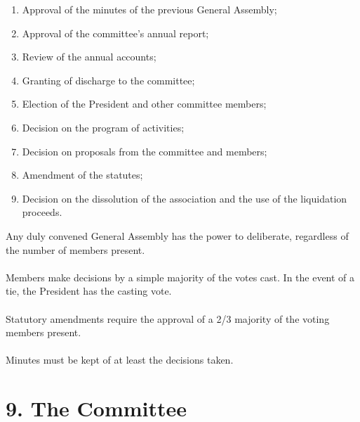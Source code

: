 \documentclass[11pt,a4paper]{article}
\begin{document}
\begin{enumerate}
    \item Approval of the minutes of the previous General Assembly;
    \item Approval of the committee's annual report;
    \item Review of the annual accounts;
    \item Granting of discharge to the committee;
    \item Election of the President and other committee members;
    \item Decision on the program of activities;
    \item Decision on proposals from the committee and members;
    \item Amendment of the statutes;
    \item Decision on the dissolution of the association and the use of the liquidation proceeds.
\end{enumerate}
Any duly convened General Assembly has the power to deliberate, regardless of the number of members present.
\\\\
Members make decisions by a simple majority of the votes cast. In the event of a tie, the President has the casting vote.
\\\\
Statutory amendments require the approval of a 2/3 majority of the voting members present.
\\\\
Minutes must be kept of at least the decisions taken.

\section*{9. The Committee}
\end{document}
